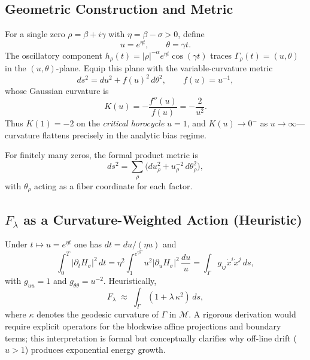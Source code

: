 \subsection{Geometric Construction and Metric}

For a single zero $\rho=\beta+i\gamma$ with $\eta=\beta-\sigma>0$, define
\[
u = e^{\eta t}, \qquad \theta = \gamma t .
\]
The oscillatory component
$h_\rho(t)=|\rho|^{-\alpha} e^{\eta t}\cos(\gamma t)$ traces
$\Gamma_\rho(t)=(u,\theta)$ in the $(u,\theta)$-plane.
Equip this plane with the variable-curvature metric
\begin{equation}
ds^2 = du^2 + f(u)^2\, d\theta^2, \qquad f(u)=u^{-1},
\tag{16.1}
\end{equation}
whose Gaussian curvature is
\begin{equation}
K(u)=-\frac{f''(u)}{f(u)}=-\frac{2}{u^2}.
\tag{16.2}
\end{equation}
Thus $K(1)=-2$ on the \emph{critical horocycle} $u=1$, and $K(u)\!\to\!0^-$ as
$u\!\to\!\infty$—curvature flattens precisely in the analytic bias regime.

For finitely many zeros, the formal product metric is
\begin{equation}
ds^2=\sum_\rho \bigl(du_\rho^2 + u_\rho^{-2}\, d\theta_\rho^2\bigr),
\tag{16.3}
\end{equation}
with $\theta_\rho$ acting as a fiber coordinate for each factor.

\subsection{\texorpdfstring{$F_\lambda$}{Fλ} as a Curvature-Weighted Action (Heuristic)}

Under $t\mapsto u=e^{\eta t}$ one has $dt=du/(\eta u)$ and
\[
\int_0^T |\partial_t H_\sigma|^2\,dt
  = \eta^2\!\!\int_{1}^{e^{\eta T}} u^2|\partial_u H_\sigma|^2\,\frac{du}{u}
  = \int_\Gamma g_{ij}\dot{x}^i\dot{x}^j\,ds,
\]
with $g_{uu}=1$ and $g_{\theta\theta}=u^{-2}$.
Heuristically,
\[
F_\lambda \;\approx\; \int_\Gamma (1+\lambda\,\kappa^2)\,ds ,
\]
where $\kappa$ denotes the geodesic curvature of $\Gamma$ in $\mathcal{M}$.
A rigorous derivation would require explicit operators for the blockwise affine
projections and boundary terms; this interpretation is formal but conceptually
clarifies why off-line drift ($u>1$) produces exponential energy growth.

